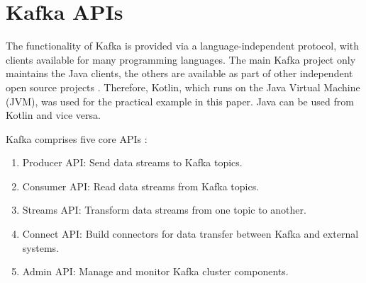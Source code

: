 \section{Kafka APIs}
\label{cha:api}

The functionality of Kafka is provided via a language-independent protocol, with clients available for many programming languages. The main Kafka project only maintains the Java clients, the others are available as part of other independent open source projects \cite{shapira2021kafka}. Therefore, Kotlin, which runs on the Java Virtual Machine (JVM), was used for the practical example in this paper. Java can be used from Kotlin and vice versa.

Kafka comprises five core APIs \cite{shapira2021kafka}:

\begin{enumerate}
    \item Producer API: Send data streams to Kafka topics.
    \item Consumer API: Read data streams from Kafka topics.
    \item Streams API: Transform data streams from one topic to another.
    \item Connect API: Build connectors for data transfer between Kafka and external systems.
    \item Admin API: Manage and monitor Kafka cluster components.
\end{enumerate}